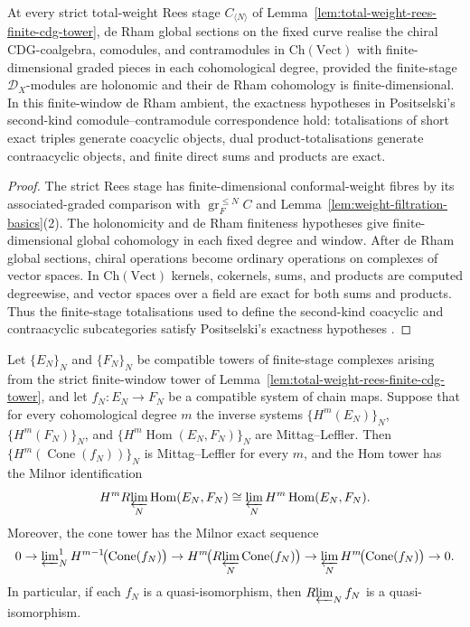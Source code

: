 \begin{lemma}
\label{lem:finite-window-derham-realization-positselski}
At every strict total-weight Rees stage $C_{\langle N\rangle}$ of
Lemma~\ref{lem:total-weight-rees-finite-cdg-tower}, de Rham global
sections on the fixed curve realise the chiral CDG-coalgebra,
comodules, and contramodules in $\mathrm{Ch}(\mathrm{Vect})$ with
finite-dimensional graded pieces in each cohomological degree,
provided the finite-stage \(\mathcal D_X\)-modules are holonomic and
their de Rham cohomology is finite-dimensional. In
this finite-window de Rham ambient, the exactness hypotheses in
Positselski's second-kind comodule--contramodule correspondence hold:
totalisations of short exact triples generate coacyclic objects,
dual product-totalisations generate contraacyclic objects, and finite
direct sums and products are exact.
\end{lemma}

\begin{proof}
The strict Rees stage has finite-dimensional conformal-weight fibres
by its associated-graded comparison with
$\operatorname{gr}^{\leq N}_F C$ and
Lemma~\ref{lem:weight-filtration-basics}(2).  The holonomicity and
de Rham finiteness hypotheses give finite-dimensional global
cohomology in each fixed degree and window.  After de Rham global
sections, chiral operations become ordinary operations on complexes
of vector spaces. In $\mathrm{Ch}(\mathrm{Vect})$ kernels,
cokernels, sums, and products are computed degreewise, and vector
spaces over a field are exact for both sums and products. Thus the
finite-stage totalisations used to define the second-kind
coacyclic and contraacyclic subcategories satisfy Positselski's
exactness hypotheses \cite[\S\S3--4]{Positselski11}.
\end{proof}

\begin{lemma}
\label{lem:hom-cone-ml-rees-towers}
Let $\{E_N\}_N$ and $\{F_N\}_N$ be compatible towers of finite-stage
complexes arising from the strict finite-window tower of
Lemma~\ref{lem:total-weight-rees-finite-cdg-tower}, and let
$f_N\colon E_N\to F_N$ be a compatible system of chain maps.  Suppose
that for every cohomological degree $m$ the inverse systems
$\{H^m(E_N)\}_N$, $\{H^m(F_N)\}_N$, and
$\{H^m\operatorname{Hom}(E_N,F_N)\}_N$ are Mittag--Leffler. Then
$\{H^m(\operatorname{Cone}(f_N))\}_N$ is Mittag--Leffler for every
$m$, and the Hom tower has the Milnor identification
\[
H^m R\!\varprojlim_N\operatorname{Hom}(E_N,F_N)
\cong
\varprojlim_N H^m\operatorname{Hom}(E_N,F_N).
\]
Moreover, the cone tower has the Milnor exact sequence
\[
0\to
\varprojlim\nolimits^1_N
H^{m-1}\!\bigl(\operatorname{Cone}(f_N)\bigr)
\to
H^m\!\bigl(R\!\varprojlim_N\operatorname{Cone}(f_N)\bigr)
\to
\varprojlim_N
H^m\!\bigl(\operatorname{Cone}(f_N)\bigr)
\to0 .
\]
In particular, if each $f_N$ is a quasi-isomorphism, then
$R\!\varprojlim_N f_N$ is a quasi-isomorphism.
\end{lemma}


